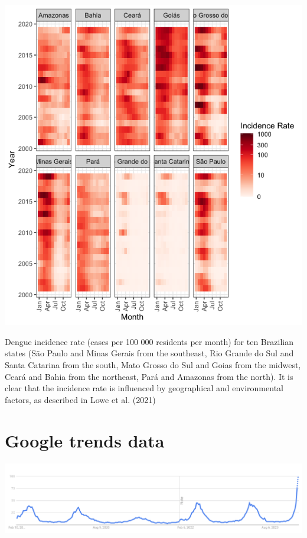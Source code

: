 \documentclass[
  letterpaper,
  DIV=11,
  numbers=noendperiod]{scrreprt}
\begin{document}
\includegraphics[width=6.25in,height=\textheight]{img/denguebrazil-incidence.png}

Dengue incidence rate (cases per 100 000 residents per month) for ten
Brazilian states (São Paulo and Minas Gerais from the southeast, Rio
Grande do Sul and Santa Catarina from the south, Mato Grosso do Sul and
Goias from the midwest, Ceará and Bahia from the northeast, Pará and
Amazonas from the north). It is clear that the incidence rate is
influenced by geographical and environmental factors, as described in
Lowe et al. (2021)

\hypertarget{google-trends-data}{%
\section{Google trends data}\label{google-trends-data}}

\includegraphics[width=1\textwidth,height=\textheight]{img/denguebrazil-googletrends.png}
\end{document}
